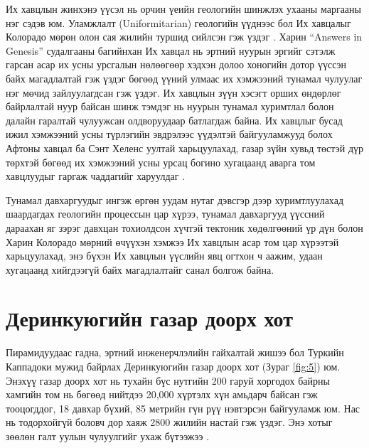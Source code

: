 \documentclass[10pt,twocolumn,letterpaper]{article}
\begin{document}
Их хавцлын жинхэнэ үүсэл нь орчин үеийн геологийн шинжлэх ухааны маргааны нэг сэдэв юм. Уламжлалт (Uniformitarian) геологийн үүднээс бол Их хавцалыг Колорадо мөрөн олон сая жилийн туршид сийлсэн гэж үздэг \cite{47}. Харин “Answers in Genesis” судалгааны багийнхан Их хавцал нь эртний нуурын эргийг сэтэлж гарсан асар их усны урсгалын нөлөөгөөр хэдхэн долоо хоногийн дотор үүссэн байх магадлалтай гэж үздэг бөгөөд үүний улмаас их хэмжээний тунамал чулуулаг нэг мөчид зайлуулагдсан гэж үздэг. Их хавцлын зүүн хэсэгт орших өндөрлөг байрлалтай нуур байсан шинж тэмдэг нь нуурын тунамал хуримтлал болон далайн гаралтай чулуужсан олдворуудаар батлагдаж байна. Их хавцлыг бусад ижил хэмжээний усны түрлэгийн эвдрэлээс үүдэлтэй байгууламжууд болох Афтоны хавцал ба Сэнт Хеленс уултай харьцуулахад, газар зүйн хувьд төстэй дүр төрхтэй бөгөөд их хэмжээний усны урсац богино хугацаанд аварга том хавцлуудыг гаргаж чаддагийг харуулдаг \cite{48}.

Тунамал давхаргуудыг ингэж өргөн уудам нутаг дэвсгэр дээр хуримтлуулахад шаардагдах геологийн процессын цар хүрээ, тунамал давхаргууд үүссний дараахан яг зэрэг давхцан тохиолдсон хүчтэй тектоник хөдөлгөөний үр дүн болон Харин Колорадо мөрний өчүүхэн хэмжээ Их хавцлын асар том цар хүрээтэй харьцуулахад, энэ бүхэн Их хавцлын үүслийн явц огтхон ч аажим, удаан хугацаанд хийгдээгүй байх магадлалтайг санал болгож байна.

\section{Деринкуюгийн газар доорх хот}

Пирамидуудаас гадна, эртний инженерчлэлийн гайхалтай жишээ бол Туркийн Каппадоки мужид байрлах Деринкуюгийн газар доорх хот (Зураг \ref{fig:5}) юм. Энэхүү газар доорх хот нь тухайн бүс нутгийн 200 гаруй хоргодох байрны хамгийн том нь бөгөөд \cite{54} нийтдээ 20,000 хүртэлх хүн амьдарч байсан гэж тооцогддог, 18 давхар бүхий, 85 метрийн гүн рүү нэвтэрсэн байгууламж юм. Нас нь тодорхойгүй боловч дор хаяж 2800 жилийн настай гэж үздэг. Энэ хотыг зөөлөн галт уулын чулуулгийг ухаж бүтээжээ \cite{52, 53}.
\end{document}
